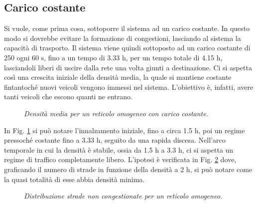\documentclass[../main.tex]{subfiles}
\begin{document}
\subsection{Carico costante}
Si vuole, come prima cosa, sottoporre il sistema ad un carico costante.
In questo modo si dovrebbe evitare la formazione di congestioni, lasciando al sistema la capacit\`a di trasporto.
Il sistema viene quindi sottoposto ad un carico costante di 250 ogni 60 s, fino a un tempo di  3.33 h, per un tempo totale di 4.15 h, lasciandoli liberi di uscire dalla rete una volta giunti a destinazione.
Ci si aspetta cos\`i una crescita iniziale della densit\`a media, la quale si mantiene costante fintantoch\'e nuovi veicoli vengono immessi nel sistema.
L'obiettivo \`e, infatti, avere tanti veicoli che escono quanti ne entrano.
\begin{figure}[H]
    \centering
    \caption[Densit\`a media per un reticolo omogeneo con carico costante]{\emph{Densit\`a media per un reticolo omogeneo con carico costante.}}
    \label{fig:density_constant_homo}
\end{figure}
In Fig. \ref{fig:density_constant_homo} si pu\`o notare l'innalzamento iniziale, fino a circa 1.5 h, poi un regime pressoch\'e costante fino a 3.33 h, seguito da una rapida discesa.
Nell'arco temporale in cui la densit\`a \`e stabile, ossia da 1.5 h a 3.3 h, ci si aspetta un regime di traffico completamente libero.
L'ipotesi \`e verificata in Fig. \ref{fig:nStreet_density_constant_homo} dove, graficando il numero di strade in funzione della densit\`a a 2 h, si pu\`o notare come la quasi totalit\`a di esse abbia densit\`a minima.
\begin{figure}[H]
    \centering
    \caption[Distribuzione strade non congestionate per un reticolo omogeneo.]{\emph{Distribuzione strade non congestionate per un reticolo omogeneo.}}
    \label{fig:nStreet_density_constant_homo}
\end{figure}
\end{document}

